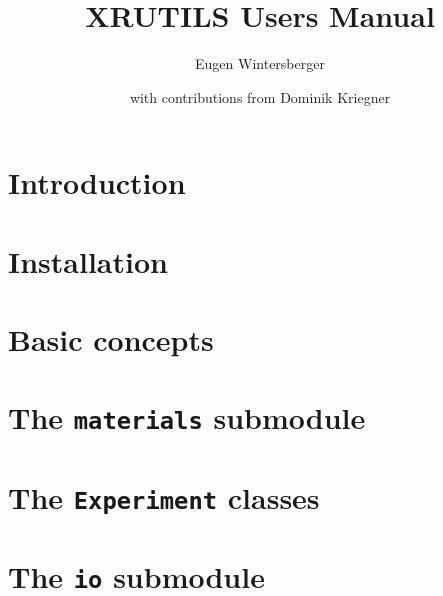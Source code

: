 \documentclass[a4paper]{book}
\title{{\Huge XRUTILS Users Manual}}
\author{Eugen Wintersberger \and with contributions from Dominik Kriegner}
\begin{document}
\maketitle
\tableofcontents

\chapter{Introduction}


\chapter{Installation}


\chapter{Basic concepts}


\chapter[The materials submodule]{The {\tt materials} submodule}


\chapter[The Experiment classes]{The {\tt Experiment} classes}


\chapter[The io submodule]{The {\tt io} submodule}

\end{document}

